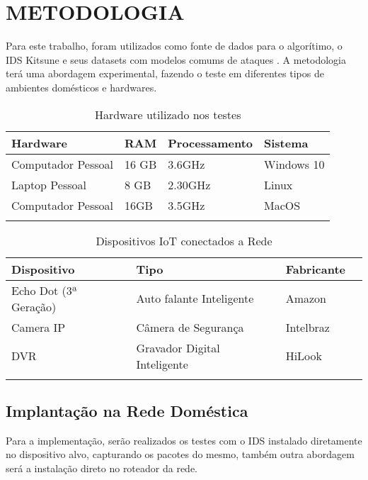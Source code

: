 \chapter{METODOLOGIA}
Para este trabalho, foram utilizados como fonte de dados para o algorítimo, o IDS Kitsune e seus datasets com modelos comums de ataques \cite{kitsune}. A metodologia terá uma abordagem experimental, fazendo o teste em diferentes tipos de ambientes domésticos e hardwares. 

\hfill
{}
\begin{table}[!hbt]
\renewcommand\thetable{2}
\setlength\tabcolsep{3pt} 
\caption{Hardware utilizado nos testes}
\centering
 \begin{tabularx}{\textwidth}{@{}*{4}{L} @{}} 
 \toprule
 Hardware & RAM & Processamento & Sistema \\ [0.5ex]
 \midrule
 Computador Pessoal &
 16 GB &
 3.6GHz &
 Windows 10 \\ 
 \addlinespace
 Laptop Pessoal &
 8 GB &
 2.30GHz &
 Linux \\ 
 \addlinespace
 Computador Pessoal &
 16GB &
 3.5GHz &
 MacOS \\ 
 \addlinespace
 \bottomrule
\end{tabularx}
\end{table}

\hfill
{}
\begin{table}[!hbt]
\renewcommand\thetable{3}
\setlength\tabcolsep{3pt} 
\caption{Dispositivos IoT conectados a Rede}
\centering
 \begin{tabularx}{\textwidth}{@{}*{4}{L} @{}} 
 \toprule
 Dispositivo & Tipo & Fabricante \\ [0.5ex]
 \midrule
 Echo Dot (3ª Geração) &
 Auto falante Inteligente &
 Amazon \\
 \addlinespace
 Camera IP &
 Câmera de Segurança &
 Intelbraz \\
 \addlinespace
 DVR &
 Gravador Digital Inteligente &
 HiLook \\
 \addlinespace
 \bottomrule
\end{tabularx}
\end{table}

\section{Implantação na Rede Doméstica}
Para a implementação, serão realizados os testes com o IDS instalado diretamente no dispositivo alvo, capturando os pacotes do mesmo, também outra abordagem será a instalação direto no roteador da rede.

